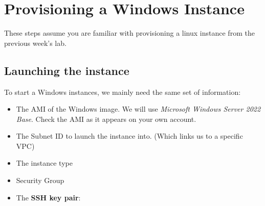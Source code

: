 





\section{Provisioning a Windows Instance}
\label{sec:provisioning-a-windows-instance}

These steps assume you are familiar with provisioning a linux instance
from the previous week's lab.

\subsection{Launching the instance}
\label{sec:launching-the-instance}

To start a Windows instances, we mainly need the same set of
information:

\begin{itemize}
\item
  The AMI of the Windows image. We will use \emph{Microsoft Windows
  Server 2022 Base}. Check the AMI as it appears on your own account.
\item
  The Subnet ID to launch the instance into. (Which links us to a specific VPC)
\item
  The instance type 
\item
  Security Group
\item
  The \textbf{SSH key pair}:
\end{itemize}


